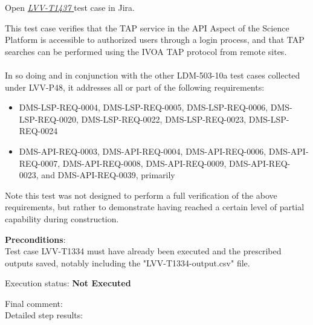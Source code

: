 \documentclass[DM,lsstdraft,STR,toc]{lsstdoc}
\providecommand{\tightlist}{
  \setlength{\itemsep}{0pt}\setlength{\parskip}{0pt}}
\begin{document}
Open  \href{https://jira.lsstcorp.org/secure/Tests.jspa#/testCase/LVV-T1437}{\textit{ LVV-T1437 } }
test case in Jira.

    This test case verifies that the TAP service in the API Aspect of the
Science Platform is accessible to authorized users through a login
process, and that TAP searches can be performed using the IVOA TAP
protocol from remote sites.\\
~\\
In so doing and in conjunction with the other LDM-503-10a test cases
collected under LVV-P48, it addresses all or part of the following
requirements:

\begin{itemize}
\tightlist
\item
  DMS-LSP-REQ-0004, DMS-LSP-REQ-0005, DMS-LSP-REQ-0006,
  DMS-LSP-REQ-0020, DMS-LSP-REQ-0022, DMS-LSP-REQ-0023, DMS-LSP-REQ-0024
\item
  DMS-API-REQ-0003, DMS-API-REQ-0004, DMS-API-REQ-0006,
  DMS-API-REQ-0007, DMS-API-REQ-0008, DMS-API-REQ-0009,
  DMS-API-REQ-0023, and DMS-API-REQ-0039, primarily
\end{itemize}

Note this test was not designed to perform a full verification of the
above requirements, but rather to demonstrate having reached a certain
level of partial capability during construction.


    \textbf{ Preconditions}:\\
    Test case LVV-T1334 must have already been executed and the prescribed
outputs saved, notably including the "LVV-T1334-output.csv" file.


    Execution status: {\bf Not Executed }

    Final comment:\\


    Detailed step results:
\end{document}
